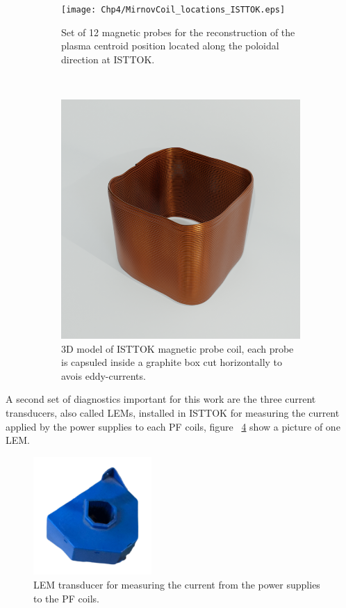 \begin{figure}
	\centering
	\begin{subfigure}[b]{0.37\textwidth}
		\texttt{[image: Chp4/MirnovCoil\_locations\_ISTTOK.eps]}
		\caption{ Set of 12 magnetic probes for the reconstruction of the plasma centroid position located along the poloidal direction at ISTTOK.\label{MirnvC} }
	\end{subfigure}
	~~
	\begin{subfigure}[b]{0.37\textwidth}
		\includegraphics[width=\textwidth]{Chp4/mirn_coil.png}
		\caption{\label{MirnvC_photo} 3D model of ISTTOK magnetic probe coil, each probe is capsuled inside a graphite box cut horizontally to avois eddy-currents. }
	\end{subfigure}
	
	\caption{ \label{} }
\end{figure}



A second set of diagnostics important for this work are the three current transducers, also called LEMs, installed in ISTTOK for measuring the current applied by the power supplies  to each  PF coils, figure ~\ref{LEM} show a picture of one LEM.

\smallskip


\begin{figure}[htbp]
	\centering
	\includegraphics[width=0.4\textwidth]{Chp4/LEM.png}
	\caption{\label{LEM} LEM transducer for measuring the current from the power supplies to the PF coils.  }
\end{figure}

